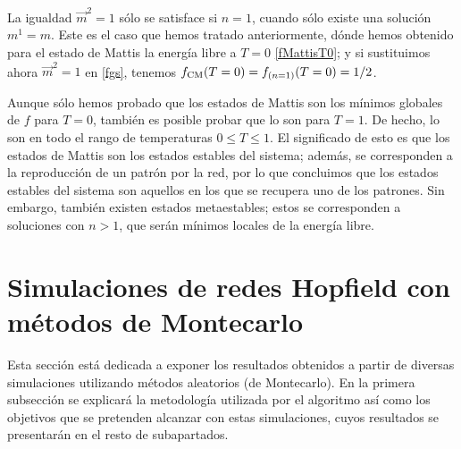 \documentclass[titlepage,12pt]{article}
\numberwithin{equation}{section}
\begin{document}
	La igualdad $\vec{m}^2=1$ sólo se satisface si $n=1$, cuando sólo existe una solución $m^1=m$. Este es el caso que hemos tratado anteriormente, dónde hemos obtenido para el estado de Mattis la energía libre a $T=0$ \eqref{fMattisT0}; y si sustituimos ahora $\vec{m}^2=1$ en \eqref{fgs}, tenemos $f_{\textnormal{CM}}(T=0)=f_{(n=1)}(T=0)=1/2$.
	
	Aunque sólo hemos probado que los estados de Mattis son los mínimos globales de $f$ para $T=0$, también es posible probar que lo son para $T=1$. De hecho, lo son en todo el rango de temperaturas $0\leq T\leq1$. El significado de esto es que los estados de Mattis son los estados estables del sistema; además, se corresponden a la reproducción de un patrón por la red, por lo que concluimos que los estados estables del sistema son aquellos en los que se recupera uno de los patrones. Sin embargo, también existen estados metaestables; estos se corresponden a soluciones con $n>1$, que serán mínimos locales de la energía libre.
	
	\section{Simulaciones de redes Hopfield con métodos de Montecarlo}
	Esta sección está dedicada a exponer los resultados obtenidos a partir de diversas simulaciones utilizando métodos aleatorios (de Montecarlo). En la primera subsección se explicará la metodología utilizada por el algoritmo así como los objetivos que se pretenden alcanzar con estas simulaciones, cuyos resultados se presentarán en el resto de subapartados.
\end{document}
